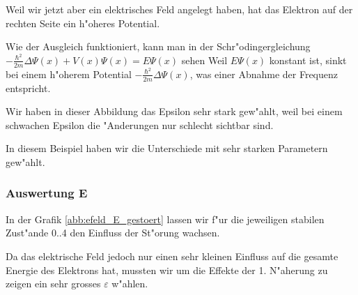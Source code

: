 \begin{refsection}
Weil wir jetzt aber ein elektrisches Feld angelegt haben, hat das Elektron auf der rechten Seite ein h"oheres Potential.

Wie der Ausgleich funktioniert, kann man in der Schr"odingergleichung 
$
-\frac{\hbar^2}{2m}\Delta\Psi(x) + V(x)\Psi(x)
=
E\Psi(x)
$ sehen
Weil $E\Psi(x)$ konstant ist, sinkt bei einem h"oherem Potential $-\frac{\hbar^2}{2m}\Delta\Psi(x)$,
was einer Abnahme der Frequenz entspricht.

Wir haben in dieser Abbildung das Epsilon sehr stark gew"ahlt,
weil bei einem schwachen Epsilon die "Anderungen nur schlecht sichtbar sind.







In diesem Beispiel haben wir die Unterschiede mit sehr starken Parametern gew"ahlt.




\subsubsection{Auswertung E}

In der Grafik \ref{abb:efeld_E_gestoert} lassen wir f"ur die jeweiligen stabilen Zust"ande 0..4 
den Einfluss der St"orung wachsen.

Da das elektrische Feld jedoch nur einen sehr kleinen Einfluss auf die gesamte Energie des 
Elektrons hat, mussten wir um die Effekte der 1. N"aherung zu zeigen ein sehr grosses $\varepsilon$
w"ahlen.


\end{refsection}
